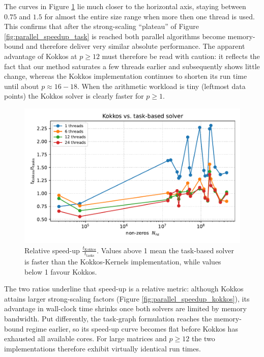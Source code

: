 The curves in Figure \ref{fig:rel_speedup_kokkos_tasks}
lie much closer to the horizontal axis,
staying between $0.75$ and $1.5$ for almost the entire size range when more then one thread is used.
This confirms that after the strong-scaling “plateau” of
Figure \ref{fig:parallel_speedup_task} is reached both
parallel algorithms become memory-bound and therefore deliver
very similar absolute performance.
The apparent advantage of Kokkos at $p\ge 12$ must therefore be read
with caution: it reflects the fact that our method saturates a few
threads earlier and subsequently shows little change, whereas the
Kokkos implementation continues to shorten its run time until about
$p\approx16{-}18$.
When the arithmetic workload is tiny (leftmost data points) the Kokkos
solver is clearly faster for $p \geq1$.

\begin{figure}
    \centering
    \includegraphics[width=1\linewidth]{report//figures//results/rel_speedup_kokkos_vs_tasks.pdf}
    \caption{Relative speed-up $\displaystyle\frac{t_{\text{Kokkos}}}{t_{\text{tasks}}}$.
Values above 1 mean the task-based solver is faster than the Kokkos-Kernels
implementation, while values below 1 favour Kokkos.}
    \label{fig:rel_speedup_kokkos_tasks}
\end{figure}

The two ratios underline that speed-up is a relative metric:
although Kokkos attains larger strong-scaling factors
(Figure \ref{fig:parallel_speedup_kokkos}),
its advantage in wall-clock time shrinks once both solvers are limited
by memory bandwidth.
Put differently, the task‐graph formulation reaches the memory-bound
regime earlier, so its speed-up curve becomes flat
before Kokkos has exhausted all available cores.
For large matrices and $p\ge12$ the two implementations therefore
exhibit virtually identical run times.

